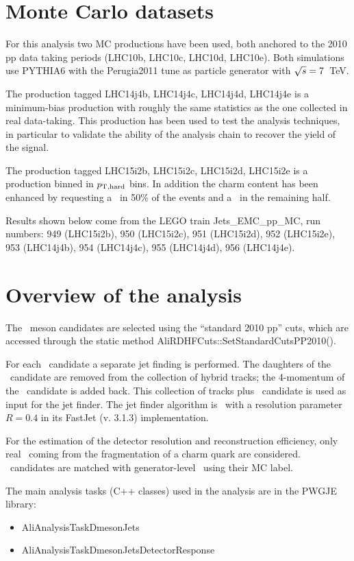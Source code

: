 \section{Monte Carlo datasets}
For this analysis two MC productions have been used, both anchored to the 2010 pp data taking periods (LHC10b, LHC10c, LHC10d, LHC10e).
Both simulations use PYTHIA6 with the Perugia2011 tune as particle generator with $\sqrt{s}=7$~TeV.

The production tagged LHC14j4b, LHC14j4c, LHC14j4d, LHC14j4e is a minimum-bias production with roughly the same statistics as the one collected in real data-taking.
This production has been used to test the analysis techniques, in particular to validate the ability of the analysis chain to recover the yield of the signal.

The production tagged LHC15i2b, LHC15i2c, LHC15i2d, LHC15i2e is a production binned in $p_{\rm T,hard}$ bins.
In addition the charm content has been enhanced by requesting a \ccbar\ in 50\% of the events and a \bbbar\ in the remaining half.

Results shown below come from the LEGO train Jets\_EMC\_pp\_MC, run numbers: 949 (LHC15i2b), 950 (LHC15i2c), 951 (LHC15i2d), 952 (LHC15i2e), 953 (LHC14j4b), 954 (LHC14j4c), 955 (LHC14j4d), 956 (LHC14j4e).
\section{Overview of the analysis}
The \Dzero\ meson candidates are selected using the ``standard 2010 pp'' cuts, which are accessed through the static method AliRDHFCuts::SetStandardCutsPP2010().

For each \Dzero\ candidate a separate jet finding is performed. The daughters of the \Dzero\ candidate are 
removed from the collection of hybrid tracks; the 4-momentum of the \Dzero\ candidate is added back. 
This collection of tracks plus \Dzero\ candidate is used as input for the jet finder.
The jet finder algorithm is \antikt\ with a resolution parameter $R=0.4$ in its FastJet (v. 3.1.3) implementation.

For the estimation of the detector resolution and reconstruction efficiency, only real \Dzero\ coming from
the fragmentation of a charm quark are considered. \Dzero\ candidates are matched with generator-level \Dzero\ using their MC label.

The main analysis tasks (C++ classes) used in the analysis are in the PWGJE library:
\begin{itemize}
\item AliAnalysisTaskDmesonJets
\item AliAnalysisTaskDmesonJetsDetectorResponse
\end{itemize}
